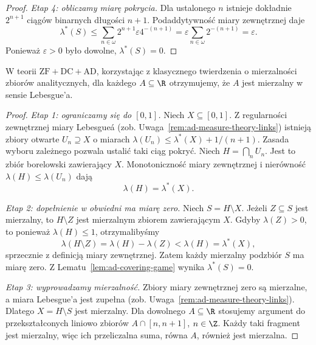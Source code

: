 \begin{proof}
\emph{Etap 4: obliczamy miarę pokrycia.}
Dla ustalonego $n$ istnieje dokładnie
$2^{n+1}$ ciągów binarnych długości $n+1$.
Podaddytywność miary zewnętrznej daje
\[
\lambda^*(S)
\le\sum_{n\in\omega}2^{n+1}\varepsilon 4^{-(n+1)}
=\varepsilon\sum_{n\in\omega}2^{-(n+1)}
=\varepsilon.
\]
Ponieważ $\varepsilon>0$ było dowolne,
$\lambda^*(S)=0$.
\end{proof}

\begin{twierdzenie}
\label{thm:ad-measurability}
W teorii $\mathrm{ZF}+\mathrm{DC}+\mathrm{AD}$,
korzystając z klasycznego twierdzenia o mierzalności
zbiorów analitycznych, dla każdego
$A\subseteq\R$ otrzymujemy, że $A$ jest
mierzalny w sensie Lebesgue'a.
\end{twierdzenie}
\begin{proof}
\emph{Etap 1: ograniczamy się do $[0,1]$.}
Niech $X\subseteq[0,1]$. Z regularności zewnętrznej miary Lebesgue\'a
(zob. Uwaga~\ref{rem:ad-measure-theory-links})
istnieją zbiory otwarte
$U_n\supseteq X$ o miarach
$\lambda(U_n)\le\lambda^*(X)+1/(n+1)$.
Zasada wyboru zależnego pozwala ustalić taki
ciąg pokryć. Niech $H=\bigcap_n U_n$.
Jest to zbiór borelowski zawierający $X$.
Monotoniczność miary zewnętrznej i nierówność
$\lambda(H)\le\lambda(U_n)$ dają
\[
 \lambda(H)=\lambda^*(X).
\]

\emph{Etap 2: dopełnienie w obwiedni ma miarę zero.}
Niech $S=H\setminus X$. Jeżeli $Z\subseteq S$
jest mierzalny, to $H\setminus Z$ jest mierzalnym
zbiorem zawierającym $X$. Gdyby $\lambda(Z)>0$,
to ponieważ $\lambda(H)\le1$, otrzymalibyśmy
\[
\lambda(H\setminus Z)=\lambda(H)-\lambda(Z)
<\lambda(H)=\lambda^*(X),
\]
sprzecznie z definicją miary zewnętrznej.
Zatem każdy mierzalny podzbiór $S$ ma miarę zero.
Z Lematu~\ref{lem:ad-covering-game} wynika
$\lambda^*(S)=0$.

\emph{Etap 3: wyprowadzamy mierzalność.}
Zbiory miary zewnętrznej zero są mierzalne,
a miara Lebesgue'a jest zupełna
(zob. Uwaga~\ref{rem:ad-measure-theory-links}). Dlatego
$X=H\setminus S$ jest mierzalny.
Dla dowolnego $A\subseteq\R$ stosujemy
argument do przekształconych liniowo zbiorów
$A\cap[n,n+1]$, $n\in\Z$. Każdy taki fragment
jest mierzalny, więc ich przeliczalna suma,
równa $A$, również jest mierzalna.
\end{proof}

